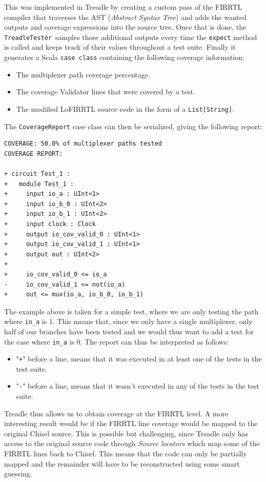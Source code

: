 \documentclass[conference]{IEEEtran}
\begin{document}
This was implemented in Treadle by creating a custom pass of the FIRRTL compiler that traverses the AST (\textit{Abstract Syntax Tree}) and adds the wanted outputs and coverage expressions into the source tree. Once that is done, the \texttt{TreadleTester} samples those additional outputs every time the \texttt{expect} method is called and keeps track of their values throughout a test suite. Finally it generates a Scala \texttt{case class} containing the following coverage information:
\begin{itemize}
\item The multiplexer path coverage percentage.
\item The coverage Validator lines that were covered by a test.
\item The modified LoFIRRTL source code in the form of a \texttt{List[String]}.
\end{itemize}
The \texttt{CoverageReport} case class can then be serialized, giving the following report:
\begin{verbatim}
COVERAGE: 50.0% of multiplexer paths tested
COVERAGE REPORT:

+ circuit Test_1 :
+   module Test_1 :
+     input io_a : UInt<1>
+     input io_b_0 : UInt<2>
+     input io_b_1 : UInt<2>
+     input clock : Clock
+     output io_cov_valid_0 : UInt<1>
+     output io_cov_valid_1 : UInt<1>
+     output out : UInt<2>
+   
+     io_cov_valid_0 <= io_a
-     io_cov_valid_1 <= not(io_a)
+     out <= mux(io_a, io_b_0, io_b_1)
\end{verbatim}
The example above is taken for a simple test, where we are only testing the path where \texttt{in\_a} is 1. This means that, since we only have a single multiplexer, only half of our branches have been tested and we would thus want to add a test for the case where \texttt{in\_a} is 0. The report can thus be interpreted as follows:  
\begin{itemize}
\item "\texttt{+}" before a line, means that it was executed in at least one of the tests in the test suite.
\item "\texttt{-}" before a line, means that it wasn't executed in any of the tests in the test suite.\\
\end{itemize}

Treadle thus allows us to obtain coverage at the FIRRTL level. A more interesting result would be if the FIRRTL line coverage would be mapped to the original Chisel source. This is possible but challenging, since Treadle only has access to the original source code through \textit{Source locators} which map some of the FIRRTL lines back to Chisel. This means that the code can only be partially mapped and the remainder will have to be reconstructed using some smart guessing.\\
\end{document}
